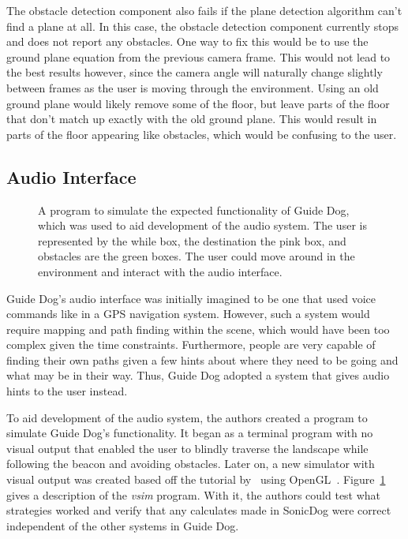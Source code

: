 The obstacle detection component also fails if the plane detection algorithm
can't find a plane at all. In this case, the obstacle detection component
currently stops and does not report any obstacles. One way to fix this would be
to use the ground plane equation from the previous camera frame. This would not
lead to the best results however, since the camera angle will naturally change
slightly between frames as the user is moving through the environment. Using an
old ground plane would likely remove some of the floor, but leave parts of the
floor that don't match up exactly with the old ground plane. This would result
in parts of the floor appearing like obstacles, which would be confusing to the
user.


\subsection{Audio Interface}
\label{sec:eval-audio}

\begin{figure}
\caption{A program to simulate the expected functionality of Guide Dog, which was
used to aid development of the audio system. The user is represented by the
while box, the destination the pink box, and obstacles are the green boxes. The
user could move around in the environment and interact with the audio interface.}
\label{fig:vsim}
\end{figure}

Guide Dog's audio interface was initially imagined to be one that used voice
commands like in a GPS navigation system. However, such a system would require
mapping and path finding within the scene, which would have been too complex
given the time constraints. Furthermore, people are very capable of finding
their own paths given a few hints about where they need to be going and what
may be in their way. Thus, Guide Dog adopted a system that gives audio hints to
the user instead.

To aid development of the audio system, the authors created a program to
simulate Guide Dog's functionality. It began as a terminal program with no
visual output that enabled the user to blindly traverse the landscape while
following the beacon and avoiding obstacles. Later on, a new simulator with 
visual output was created based off the tutorial by~\cite{openal-tutorial} using
OpenGL~\cite{opengl-website}. Figure~\ref{fig:vsim} gives a description of the 
\emph{vsim} program. With it, the authors could test what strategies worked and
verify that any calculates made in SonicDog were correct independent of the
other systems in Guide Dog.

